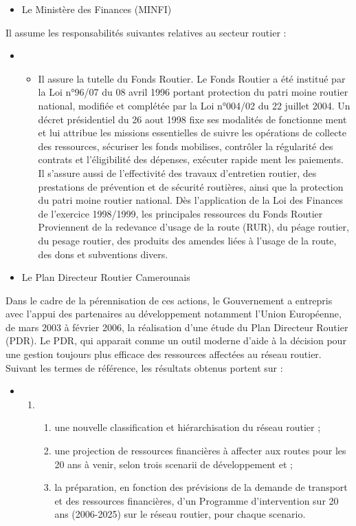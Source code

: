 \begin{itemize}
\item Le Ministère des Finances (MINFI)
\end{itemize}
Il assume les responsabilités suivantes relatives au secteur routier :
\begin{itemize}
\item[]
\begin{itemize}
\item Il assure la tutelle du Fonds Routier.
Le Fonds Routier a été institué par la Loi n°96/07 du 08 avril 1996 portant protection du patri moine routier national, modifiée et complétée par la Loi n°004/02 du 22 juillet 2004. Un décret présidentiel du 26 aout 1998 fixe ses modalités de fonctionne ment et lui attribue les missions essentielles de suivre les opérations de collecte des ressources, sécuriser les fonds mobilises, contrôler la régularité des contrats et l'éligibilité des dépenses, exécuter rapide ment les paiements. Il s'assure aussi de l'effectivité des travaux d'entretien routier, des prestations de prévention et de sécurité routières, ainsi que la protection du patri moine routier national. Dès l'application de la Loi des Finances de l'exercice 1998/1999, les principales ressources du Fonds Routier
Proviennent de la redevance d'usage de la route (RUR), du péage routier, du pesage routier, des produits des amendes liées à l'usage de la route, des dons et subventions divers.
\end{itemize}
\end{itemize}
\begin{itemize}
\item Le Plan Directeur Routier Camerounais
\end{itemize}
Dans le cadre de la pérennisation de ces actions, le Gouvernement a entrepris avec l'appui des partenaires au développement notamment l'Union Européenne, de mars 2003 à février 2006, la réalisation d'une étude du Plan Directeur Routier (PDR). Le PDR, qui apparait comme un outil moderne d'aide à la décision pour une gestion toujours plus efficace des ressources affectées au réseau routier.
Suivant les termes de référence, les résultats obtenus portent sur :
\begin{itemize}
\item[]
\begin{enumerate}
\item[]
\begin{enumerate}
\item une nouvelle classification et hiérarchisation du réseau routier ;
\item une projection de ressources financières à affecter aux routes pour les 20 ans à venir, selon trois scenarii de développement et ;
\item la préparation, en fonction des prévisions de la demande de transport et des ressources financières, d'un Programme d'intervention sur 20 ans (2006-2025) sur le réseau routier, pour chaque scenario.
\end{enumerate}
\end{enumerate}
\end{itemize}

